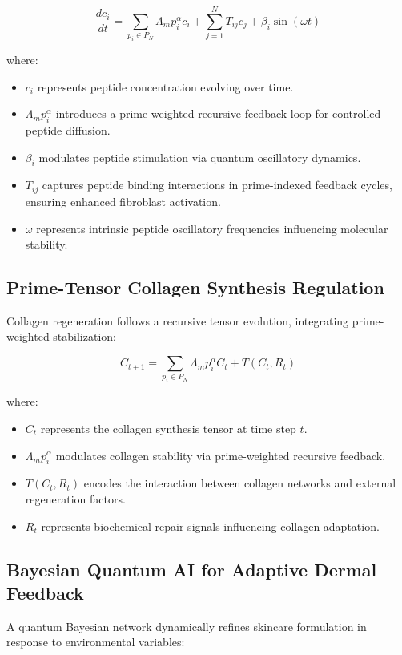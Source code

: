 \documentclass{article}
\theoremstyle{plain}
\theoremstyle{claimstyle}
\begin{document}
\begin{equation}
    \frac{d c_i}{dt} = \sum_{p_i \in P_N} \Lambda_m p_i^{\alpha} c_i + \sum_{j=1}^{N} T_{ij} c_j + \beta_i \sin(\omega t)
\end{equation}

where:
\begin{itemize}
    \item \( c_i \) represents peptide concentration evolving over time.
    \item \( \Lambda_m p_i^{\alpha} \) introduces a prime-weighted recursive feedback loop for controlled peptide diffusion.
    \item \( \beta_i \) modulates peptide stimulation via quantum oscillatory dynamics.
    \item \( T_{ij} \) captures peptide binding interactions in prime-indexed feedback cycles, ensuring enhanced fibroblast activation.
    \item \( \omega \) represents intrinsic peptide oscillatory frequencies influencing molecular stability.
\end{itemize}

\subsection{Prime-Tensor Collagen Synthesis Regulation}
Collagen regeneration follows a recursive tensor evolution, integrating prime-weighted stabilization:

\begin{equation}
    C_{t+1} = \sum_{p_i \in P_N} \Lambda_m p_i^{\alpha} C_t + T(C_t, R_t)
\end{equation}

where:
\begin{itemize}
    \item \( C_t \) represents the collagen synthesis tensor at time step \( t \).
    \item \( \Lambda_m p_i^{\alpha} \) modulates collagen stability via prime-weighted recursive feedback.
    \item \( T(C_t, R_t) \) encodes the interaction between collagen networks and external regeneration factors.
    \item \( R_t \) represents biochemical repair signals influencing collagen adaptation.
\end{itemize}

\subsection{Bayesian Quantum AI for Adaptive Dermal Feedback}
A quantum Bayesian network dynamically refines skincare formulation in response to environmental variables:
\end{document}
